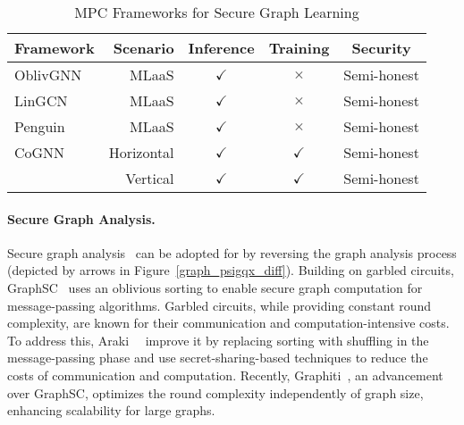 \begin{table}[!t]
\centering
\caption{MPC Frameworks for Secure Graph Learning}
\setlength\tabcolsep{2pt}
\begin{tabular}{|l|r|c|c|c|}
\hline
\multicolumn{1}{|c|}{\textbf{Framework}} & \textbf{Scenario} & \textbf{Inference} & \textbf{Training} & \textbf{Security} 
\\ \hline\hline
 OblivGNN~\cite{uss/XuL0AYY24}	 	 & MLaaS	 & $\checkmark$ 	 & $\times$	 & Semi-honest  \\\hline
LinGCN~\cite{nips/PengRLZHTGWXWD23} 	 & MLaaS	 & $\checkmark$ 	 & $\times$	 & Semi-honest  \\\hline
Penguin~\cite{nips/RanXLWQW23} 	 & MLaaS	 & $\checkmark$ 	 & $\times$	 & Semi-honest  \\\hline
 CoGNN~\cite{ccs/ZouLSLXX24} 	 & Horizontal 	 & $\checkmark$ 	 & $\checkmark$ & Semi-honest\\\hline
\cgnn 	 	 & Vertical	 	 & $\checkmark$ 	 	 & $\checkmark$ 	 & Semi-honest 	 \\
\hline
\end{tabular}
\label{tab:compare_sec_graph}
\end{table}


\paragraph{Secure Graph Analysis.} 
Secure graph analysis~\cite{sp/NayakWIWTS15,ccs/Araki0OPRT21} can be adopted for \osmm by reversing the graph analysis process (depicted by arrows in Figure~\ref{graph_psigqx_diff}).
Building on  garbled circuits, GraphSC~\cite{sp/NayakWIWTS15} uses an oblivious sorting to enable secure graph computation for message-passing algorithms.
Garbled circuits, while providing constant round complexity, are known for their communication and computation-intensive costs.
To address this, Araki~\etal~\cite{ccs/Araki0OPRT21} improve it by replacing sorting with  shuffling in the message-passing phase %
and use secret-sharing-based techniques to reduce the costs of communication and computation.
Recently,  Graphiti~\cite{ccs/KotiKPG24}, an advancement over GraphSC, optimizes the round complexity independently of graph size, enhancing scalability for large graphs.

